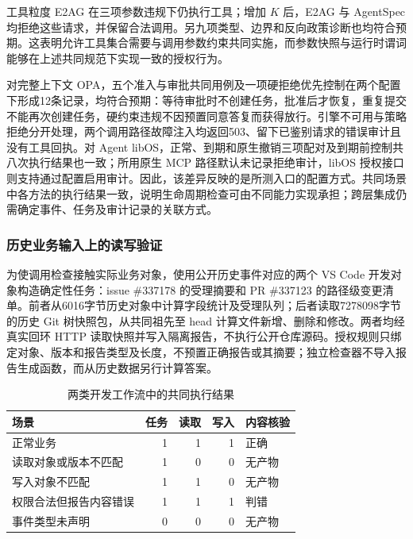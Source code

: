 工具粒度 E2AG 在三项参数违规下仍执行工具；增加 $K$ 后，E2AG 与 AgentSpec 均拒绝这些请求，并保留合法调用。另九项类型、边界和反向政策诊断也均符合预期。这表明允许工具集合需要与调用参数约束共同实施，而参数快照与运行时谓词能够在上述共同规范下实现一致的授权行为。

对完整上下文 OPA，五个准入与审批共同用例及一项硬拒绝优先控制在两个配置下形成12条记录，均符合预期：等待审批时不创建任务，批准后才恢复，重复提交不能再次创建任务，硬约束违规不因预置同意答复而获得放行。引擎不可用与策略拒绝分开处理，两个调用路径故障注入均返回503、留下已鉴别请求的错误审计且没有工具回执。对 Agent libOS，正常、到期和原生撤销三项配对及到期前控制共八次执行结果也一致；所用原生 MCP 路径默认未记录拒绝审计，libOS 授权接口则支持通过配置启用审计。因此，该差异反映的是所测入口的配置方式。共同场景中各方法的执行结果一致，说明生命周期检查可由不同能力实现承担；跨层集成仍需确定事件、任务及审计记录的关联方式。

\subsubsection{历史业务输入上的读写验证}
\label{sec:business-rr022}

为使调用检查接触实际业务对象，使用公开历史事件对应的两个 VS Code 开发对象构造确定性任务：issue \#337178 的受理摘要和 PR \#337123 的路径级变更清单。前者从6016字节历史对象中计算字段统计及受理队列；后者读取7278098字节的历史 Git 树快照包，从共同祖先至 head 计算文件新增、删除和修改。两者均经真实回环 HTTP 读取快照并写入隔离报告，不执行公开仓库源码。授权规则只绑定对象、版本和报告类型及长度，不预置正确报告或其摘要；独立检查器不导入报告生成函数，而从历史数据另行计算答案。

\begin{table}[htbp]
\centering
\caption{两类开发工作流中的共同执行结果}
\label{tab:business-rr022}
\small
\begin{tabular}{p{50mm}rrrp{31mm}}
\toprule
场景 & 任务 & 读取 & 写入 & 内容核验 \\
\midrule
正常业务 & 1 & 1 & 1 & 正确 \\
读取对象或版本不匹配 & 1 & 0 & 0 & 无产物 \\
写入对象不匹配 & 1 & 1 & 0 & 无产物 \\
权限合法但报告内容错误 & 1 & 1 & 1 & 判错 \\
事件类型未声明 & 0 & 0 & 0 & 无产物 \\
\bottomrule
\end{tabular}
\end{table}

